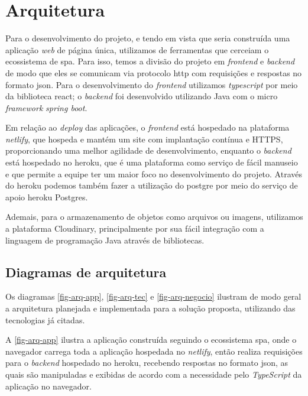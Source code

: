 \section{Arquitetura}
Para o desenvolvimento do projeto, e tendo em vista que seria construída uma aplicação \textit{web} de página única, utilizamos de ferramentas que cerceiam o ecossistema de \ac{spa}. Para isso, temos a divisão do projeto em \textit{\gls{frontend}} e \textit{\gls{backend}} de modo que eles se comunicam via protocolo \ac{http} com requisições e respostas no formato \ac{json}. Para o desenvolvimento do \textit{\gls{frontend}} utilizamos \textit{\gls{typescript}} por meio da biblioteca \gls{react}; o \textit{\gls{backend}} foi desenvolvido utilizando Java com o micro \textit{\gls{framework}} \textit{\gls{spring boot}}.

Em relação ao \textit{\gls{deploy}} das aplicações, o \textit{\gls{frontend}} está hospedado na plataforma \textit{\gls{netlify}}, que hospeda e mantém um site com implantação contínua e HTTPS, proporcionando uma melhor agilidade de desenvolvimento, enquanto o \textit{\gls{backend}} está hospedado no \gls{heroku}, que é uma plataforma como serviço de fácil manuseio e que permite a equipe ter um maior foco no desenvolvimento do projeto. Através do \gls{heroku} podemos também fazer a utilização do \gls{postgre} por meio do serviço de apoio \gls{heroku} Postgres.

Ademais, para o armazenamento de objetos como arquivos ou imagens, utilizamos a plataforma Cloudinary, principalmente por sua fácil integração com a linguagem de programação Java através de bibliotecas.

\subsection{Diagramas de arquitetura}
Os diagramas \autoref{fig-arq-app}, \autoref{fig-arq-tec} e \autoref{fig-arq-negocio} ilustram de modo geral a arquitetura planejada e implementada para a solução proposta, utilizando das tecnologias já citadas.

A \autoref{fig-arq-app} ilustra a aplicação construída seguindo o ecossistema \ac{spa}, onde o navegador carrega toda a aplicação hospedada no \textit{\gls{netlify}}, então realiza requisições para o \textit{\gls{backend}} hospedado no \gls{heroku}, recebendo respostas no formato \ac{json}, as quais são manipuladas e exibidas de acordo com a necessidade pelo \textit{TypeScript} da aplicação no navegador.

